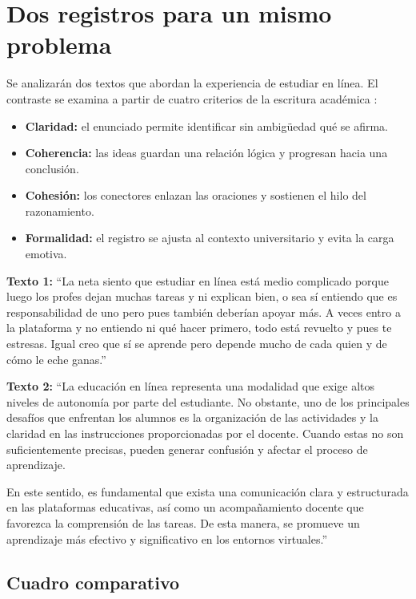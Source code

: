 \documentclass[
	spanish, %
	letterpaper, oneside
]{article}
\begin{document}
\section{Dos registros para un mismo problema}

Se analizarán dos textos que abordan la experiencia de estudiar en línea. El contraste se examina a partir de cuatro criterios de la escritura académica \citep{nunezcortesEscrituraAcademicaTeoria2015}:

\begin{itemize}
  \item \textbf{Claridad:} el enunciado permite identificar sin ambigüedad qué se afirma.
  \item \textbf{Coherencia:} las ideas guardan una relación lógica y progresan hacia una conclusión.
  \item \textbf{Cohesión:} los conectores enlazan las oraciones y sostienen el hilo del razonamiento.
  \item \textbf{Formalidad:} el registro se ajusta al contexto universitario y evita la carga emotiva.
\end{itemize}

\textbf{Texto 1:} ``La neta siento que estudiar en línea está medio complicado porque luego los profes dejan muchas tareas y ni explican bien, o sea sí entiendo que es responsabilidad de uno pero pues también deberían apoyar más. A veces entro a la plataforma y no entiendo ni qué hacer primero, todo está revuelto y pues te estresas. Igual creo que sí se aprende pero depende mucho de cada quien y de cómo le eche ganas.''

\textbf{Texto 2:} ``La educación en línea representa una modalidad que exige altos niveles de autonomía por parte del estudiante. No obstante, uno de los principales desafíos que enfrentan los alumnos es la organización de las actividades y la claridad en las instrucciones proporcionadas por el docente. Cuando estas no son suficientemente precisas, pueden generar confusión y afectar el proceso de aprendizaje. 

En este sentido, es fundamental que exista una comunicación clara y estructurada en las plataformas educativas, así como un acompañamiento docente que favorezca la comprensión de las tareas. De esta manera, se promueve un aprendizaje más efectivo y significativo en los entornos virtuales.'' 

\subsection{Cuadro comparativo}
\end{document}
